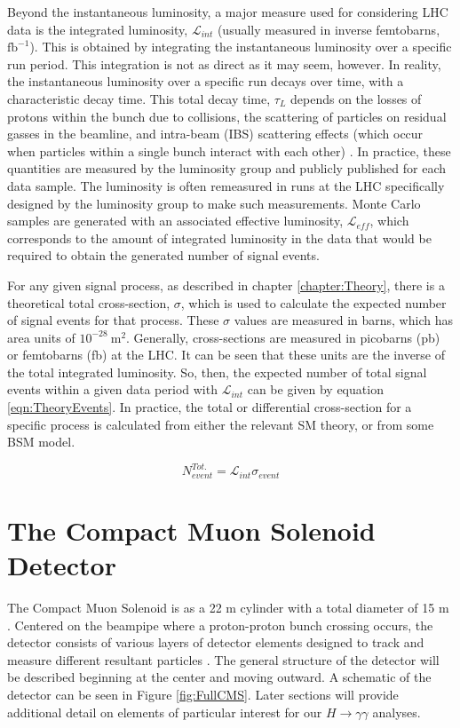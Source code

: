 \documentclass[12pt]{ucsddissertation}
\begin{document}
Beyond the instantaneous luminosity, a major measure used for considering LHC data is the integrated luminosity, $\mathcal{L}_{int}$ (usually measured in inverse femtobarns, $\mathrm{fb}^{-1}$). This is obtained by integrating the instantaneous luminosity over a specific run period. This integration is not as direct as it may seem, however. In reality, the instantaneous luminosity over a specific run decays over time, with a characteristic decay time. This total decay time, $\tau_L$ depends on the losses of protons within the bunch due to collisions, the scattering of particles on residual gasses in the beamline, and intra-beam (IBS) scattering effects (which occur when particles within a single bunch interact with each other) \cite{LHC2008}. In practice, these quantities are measured by the luminosity group and publicly published for each data sample. The luminosity is often remeasured in runs at the LHC specifically designed by the luminosity group to make such measurements. Monte Carlo samples are generated with an associated effective luminosity, $\mathcal{L}_{eff}$, which corresponds to the amount of integrated luminosity in the data that would be required to obtain the generated number of signal events.

For any given signal process, as described in chapter \ref{chapter:Theory}, there is a theoretical total cross-section, $\sigma$, which is used to calculate the expected number of signal events for that process. These $\sigma$ values are measured in barns, which has area units of $10^{-28} \ \mathrm{m}^2$. Generally, cross-sections are measured in picobarns (pb) or femtobarns (fb) at the LHC. It can be seen that these units are the inverse of the total integrated luminosity. So, then, the expected number of total signal events within a given data period with $\mathcal{L}_{int}$ can be given by equation \ref{eqn:TheoryEvents}. In practice, the total or differential cross-section for a specific process is calculated from either the relevant SM theory, or from some BSM model.

\begin{equation}\label{eqn:TheoryEvents}
    N^{Tot.}_{event} = \mathcal{L}_{int} \sigma_{event}
\end{equation}

\section{The Compact Muon Solenoid Detector}
The Compact Muon Solenoid is as a 22 m cylinder with a total diameter of 15 m \cite{CMS2008}. Centered on the beampipe where a proton-proton bunch crossing occurs, the detector consists of various layers of detector elements designed to track and measure different resultant particles \cite{CMS2024}. The general structure of the detector will be described beginning at the center and moving outward. A schematic of the detector can be seen in Figure \ref{fig:FullCMS}. Later sections will provide additional detail on elements of particular interest for our $H \rightarrow \gamma\gamma$ analyses. 
\end{document}
